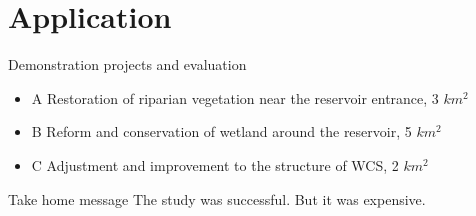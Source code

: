 \section{Application}

\begin{frame}{Demonstration projects and evaluation}
\begin{itemize}
	\item <1-> A Restoration of riparian vegetation near the reservoir entrance, 3 $km^2$
	\item <2-> B Reform and conservation of wetland around the reservoir, 5 $km^2$
	\item <3-> C Adjustment and improvement to the structure of WCS, 2 $km^2$	
\end{itemize}

\end{frame}


\begin{frame}{Take home message}
The study was successful. But it was expensive.
\end{frame}